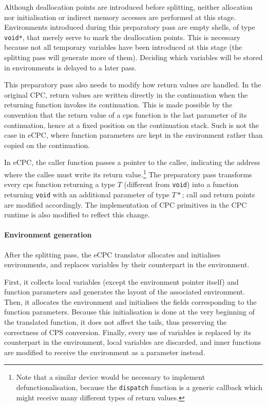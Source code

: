 \documentclass[a4paper]{llncs}
\begin{document}
Although deallocation points are introduced before splitting, neither allocation
nor initialisation or indirect memory accesses are performed at this stage.
Environments introduced during this preparatory pass are empty shells, of type
\texttt{void*}, that merely serve to mark the deallocation points.  This is
necessary because not all temporary variables have been introduced at this
stage (the splitting pass will generate more of them).  Deciding which variables
will be stored in environments is delayed to a later pass.

This preparatory pass also needs to modify how return values are handled.  In
the original CPC, return values are written directly in the continuation when
the returning function invokes its continuation.  This is made possible by the
convention that the return value of a cps function is the last parameter of its
continuation, hence at a fixed position on the continuation stack.  Such is not
the case in eCPC, where function parameters are kept in the environment rather
than copied on the continuation.

In eCPC, the caller function passes a pointer to the callee, indicating the
address where the callee must write its return value.\footnote{Note that a
similar device would be necessary to implement defunctionalisation, because the
\texttt{dispatch} function is a generic callback which might receive many
different types of return values.} The preparatory pass transforms every cps
function returning a type $T$ (different from \texttt{void}) into a function
returning \texttt{void} with an additional parameter of type $T*$; call and return
points are modified accordingly.  The implementation of CPC primitives in the
CPC runtime is also modified to reflect this change.

\paragraph{Environment generation}

After the splitting pass, the eCPC translator allocates and initialises
environments, and replaces variables by their counterpart in the environment.

First, it collects local variables (except the environment pointer itself) and
function parameters and generates the layout of the associated environment.
Then, it allocates the environment and initialises the fields corresponding to
the function parameters.  Because this initialisation is done at the very
beginning of the translated function, it does not affect the tails, thus
preserving the correctness of CPS conversion.  Finally, every use of variables
is replaced by its counterpart in the environment, local variables are
discarded, and inner functions are modified to receive the environment as a
parameter instead.
\end{document}
